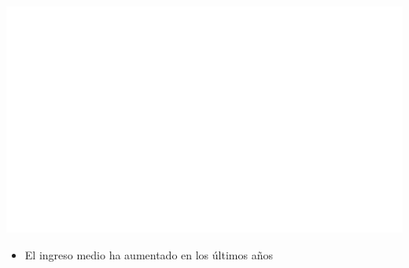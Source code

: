 \documentclass[aspectratio=169]{beamer}
\begin{document}
    \begin{slide}{3} 
                      \begin{imagecolumn}
                      
                    \includegraphics{var_5_scatter_time.png}
            \end{imagecolumn}
            \begin{textcolumn}
                \begin{itemize}
                    \item El ingreso medio ha aumentado en los últimos años
                \end{itemize}
            \end{textcolumn}

    \printcolumns
    \end{slide}
    
    
\end{document}
